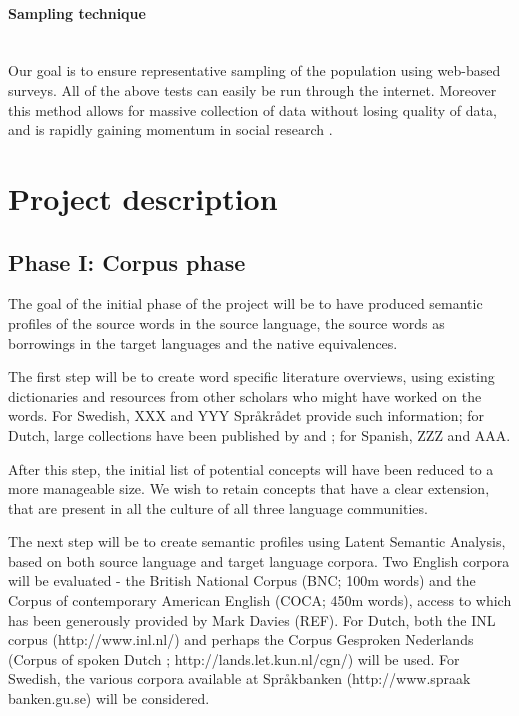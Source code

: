 \documentclass[a4paper]{article}
\begin{document}
\paragraph{Sampling technique}
\hspace{0pt} \\
Our goal is to ensure representative sampling of the population using web-based surveys.
All of the above tests can easily be run through the internet.
Moreover this method allows for massive collection of data without losing quality of data, and is rapidly gaining momentum in social research \citep{Denscombe2010}.










\section{Project description}



\subsection{Phase I: Corpus phase}
\label{sect_corpus}

The goal of the initial phase of the project will be to have produced semantic profiles of the source words in the source language, the source words as borrowings in the target languages and the native equivalences. 

The first step will be to create word specific literature overviews, using existing dictionaries and resources from other scholars who might have worked on the words. For Swedish, XXX and YYY Spr\aa kr\aa det provide such information; for Dutch, large collections have been published by \cite{Koops2009} and \cite{Braamkolk2005}; for Spanish, ZZZ and AAA.

After this step, the initial list of potential concepts will have been reduced to a more manageable size. We wish to retain concepts that have a clear extension, that are present in all the culture of all three language communities.

The next step will be to create semantic profiles using Latent Semantic Analysis, based on both source language and target language corpora. Two English corpora will be evaluated - the British National Corpus (BNC; 100m words) and the Corpus of contemporary American English (COCA; 450m words), access to which has been generously provided by Mark Davies (REF). For Dutch, both the INL corpus (http://www.inl.nl/) and perhaps the Corpus Gesproken Nederlands (Corpus of spoken Dutch ; http://lands.let.kun.nl/cgn/) will be used. For Swedish, the various corpora available at Spr\aa kbanken (http://www.spraak\\banken.gu.se) will be considered.
\end{document}

